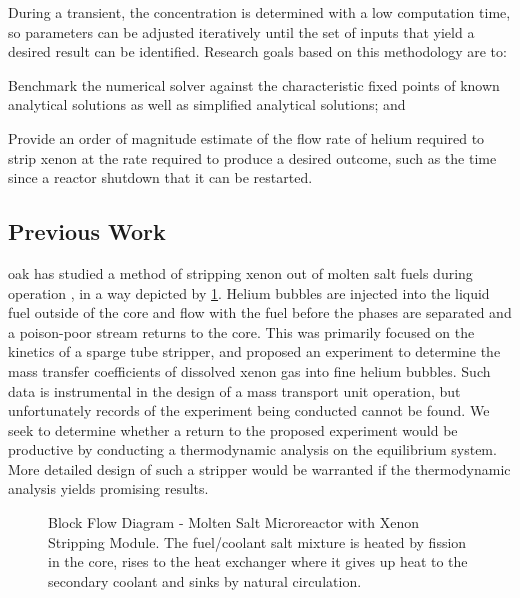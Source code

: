 During a transient, the \Xe concentration is determined with a low computation time, so parameters can be adjusted iteratively until the set of inputs that yield a desired result can be identified. Research goals based on this methodology are to:
\begin{enumerate*}[topsep=3pt,itemsep=-0.75ex,partopsep=1ex,parsep=1ex,label=(\arabic*)]
    \item Benchmark the numerical solver against the characteristic fixed points of known analytical solutions as well as simplified analytical solutions; and
    \item Provide an order of magnitude estimate of the flow rate of helium required to strip xenon at the rate required to produce a desired outcome, such as the time since a reactor shutdown that it can be restarted.
\end{enumerate*}

\subsection{Previous Work}
\acf{oak} has studied a method of stripping xenon out of molten salt fuels during operation \cite{ORNL-masstransport}, in a way depicted by \cref{fig:BFD}. Helium bubbles are injected into the liquid fuel outside of the core and flow with the fuel before the phases are separated and a poison-poor stream returns to the core. This was primarily focused on the kinetics of a sparge tube stripper, and proposed an experiment to determine the mass transfer coefficients of dissolved xenon gas into fine helium bubbles. Such data is instrumental in the design of a mass transport unit operation, but unfortunately records of the experiment being conducted cannot be found. We seek to determine whether a return to the proposed experiment would be productive by conducting a thermodynamic analysis on the equilibrium system. More detailed design of such a stripper would be warranted if the thermodynamic analysis yields promising results.

\vspace{\baselineskip}

\begin{figure}[!ht]\centering
    
    \caption[Block Flow Diagram - Molten Salt Microreactor with Xenon Stripping Module]{Block Flow Diagram - Molten Salt Microreactor with Xenon Stripping Module. The fuel/coolant salt mixture is heated by fission in the core, rises to the heat exchanger where it gives up heat to the secondary coolant and sinks by natural circulation. }
    \label{fig:BFD}
\end{figure}

